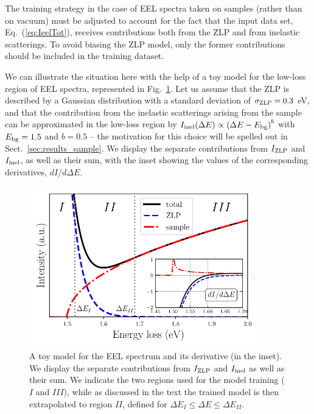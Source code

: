 The training strategy in the case of EEL spectra taken on samples (rather than on vacuum) must be adjusted
to account for the fact that the input data set, Eq.~(\ref{eq:IeelTot}), receives contributions
both from the ZLP and from inelastic scatterings.
%
To avoid biasing the ZLP model, only the former contributions should be
included in the training dataset.

We can illustrate the situation here with the help of a toy model for the low-loss
region of EEL spectra, represented in
Fig.~\ref{fig:EELS_toy}.
%
Let us assume that the ZLP is described by a Gaussian distribution with a standard deviation of $\sigma_{\rm ZLP}=0.3$ eV,
and that the contribution from the
inelastic scatterings arising from the sample can be approximated in the low-loss
region by $I_{\rm inel}(\Delta E)\propto \left( \Delta E - E_{\rm bg}\right)^b$ with $E_{\rm bg}=1.5$
and $b=0.5$ -- the motivation for this
choice will be spelled out in Sect.~\ref{sec:results_sample}.
%
We display the separate contributions from $I_{\rm ZLP}$
and $I_{\rm inel}$, as well as their sum, 
with the inset showing the values of the corresponding derivatives, $dI/d\Delta E$.

\begin{figure}[t]
    \centering
    \includegraphics[width=0.89\textwidth]{plots/EELS_toy.pdf}
    \caption{A toy model for the EEL spectrum and its
      derivative (in the inset).
      We display the separate contributions from $I_{\rm ZLP}$
      and $I_{\rm inel}$ as well as their sum.
      We indicate the two regions used for the model training ($I$ and $III$),
      while as discussed in the text the trained model is then
      extrapolated to region $II$, defined for $\Delta E_I \le \Delta E \le \Delta E_{II}$.
    }
    \label{fig:EELS_toy}
\end{figure}

